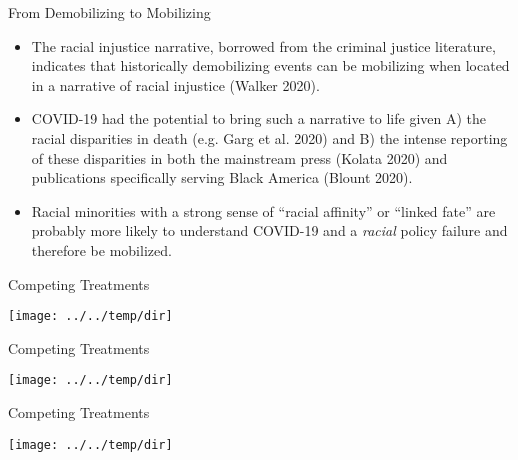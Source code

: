 \documentclass[
  ignorenonframetext,
  aspectratio=169]{beamer}
\providecommand{\tightlist}{%
  \setlength{\itemsep}{0pt}\setlength{\parskip}{0pt}}
\begin{document}
\begin{frame}{From Demobilizing to Mobilizing}
\protect\hypertarget{from-demobilizing-to-mobilizing}{}
\begin{itemize}[<+->]
\tightlist
\item
  The racial injustice narrative, borrowed from the criminal justice
  literature, indicates that historically demobilizing events can be
  mobilizing when located in a narrative of racial injustice (Walker
  2020).
\end{itemize}

\begin{itemize}[<+->]
\tightlist
\item
  COVID-19 had the potential to bring such a narrative to life given A)
  the racial disparities in death (e.g. Garg et al. 2020) and B) the
  intense reporting of these disparities in both the mainstream press
  (Kolata 2020) and publications specifically serving Black America
  (Blount 2020).
\end{itemize}

\begin{itemize}[<+->]
\tightlist
\item
  Racial minorities with a strong sense of ``racial affinity'' or
  ``linked fate'' are probably more likely to understand COVID-19 and a
  \emph{racial} policy failure and therefore be mobilized.
\end{itemize}
\end{frame}

\begin{frame}{Competing Treatments}
\protect\hypertarget{competing-treatments}{}
\begin{center}\texttt{[image: ../../temp/dir]} \end{center}
\end{frame}

\begin{frame}{Competing Treatments}
\protect\hypertarget{competing-treatments-1}{}
\begin{center}\texttt{[image: ../../temp/dir]} \end{center}
\end{frame}

\begin{frame}{Competing Treatments}
\protect\hypertarget{competing-treatments-2}{}
\begin{center}\texttt{[image: ../../temp/dir]} \end{center}
\end{frame}
\end{document}
